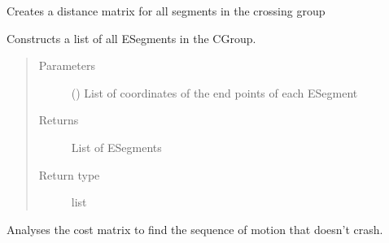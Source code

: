 \documentclass[letterpaper,10pt,english]{sphinxmanual}
\begin{document}
\begin{fulllineitems}

\begin{fulllineitems}
\label{\detokenize{reference:taipanPyRouter.CGroupSolver.constructCMatrix}}
Creates a distance matrix for all segments in the crossing group

\end{fulllineitems}


\begin{fulllineitems}
\label{\detokenize{reference:taipanPyRouter.CGroupSolver.constructESegments}}
Constructs a list of all ESegments in the CGroup.
\begin{quote}\begin{description}
\item[{Parameters}] \leavevmode
{} () \textendash{} List of coordinates of the end points of each ESegment

\item[{Returns}] \leavevmode
List of ESegments

\item[{Return type}] \leavevmode
list

\end{description}\end{quote}

\end{fulllineitems}


\begin{fulllineitems}
\label{\detokenize{reference:taipanPyRouter.CGroupSolver.findMovingSequence}}
Analyses the cost matrix to find the sequence of motion that doesn’t crash.

\end{fulllineitems}


\begin{fulllineitems}
\label{\detokenize{reference:taipanPyRouter.CGroupSolver.findMovingSequenceBF}}
\end{fulllineitems}


\end{fulllineitems}
\end{document}
